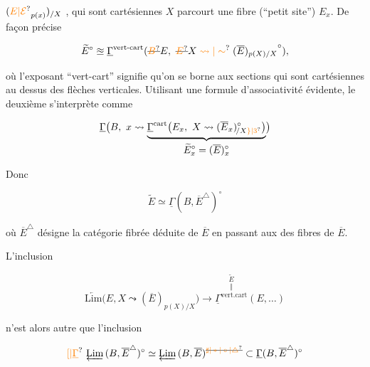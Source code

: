 $(\unsure{E|\mathcal E}_{p(x)})_{/X}$ ,
 qui sont
cartésiennes  $X$ parcourt une fibre
(``petit site'') $E_x$. De façon précise

\[
\widetilde E^\circ \approxeq \underline{\Gamma}^{\mathrm{vert\text{-}cart}}
(\deleted{\unsure{B}}E,\ \deleted{\unsure{E}}X\mathrel{\unsure{\leadsto|\sim}}
{(\overline E)_{p(X)/X}}^\circ),
\]

où l'exposant ``vert-cart'' signifie qu'on
se borne aux sections qui sont cartésiennes
au dessus des flèches verticales. Utilisant
une formule d'associativité évidente, le
deuxième  s'interprète comme

\[
\underline{\Gamma}\bigl(B,\ x\leadsto
\underbrace{\underline{\Gamma}^{\mathrm{cart}}\bigl(E_x,\ X\leadsto
(\overline E_x)^\circ_{\!/X\unsure{\rbrace|3}}\bigr)}_{\displaystyle\widetilde E_x^\circ=(\overline E)_x^\circ}
\bigr)
\]

Donc

\[
\widetilde E\simeq\underline{\Gamma}(B,\overline E^\triangle)^\circ
\]

où $\overline E^\triangle$ désigne la catégorie fibrée déduite de
$\overline E$ en passant aux   des fibres de $\overline E$.

L'inclusion

\[
\underleftarrow{\mathrm{Lim}}\bigl(E,X\leadsto(\overline E)_{p(X)/X}\bigr)
\longrightarrow\overset{\widetilde E}{\overset{\Vert}{\underline{\Gamma}^{\mathrm{vert.cart}}}}
(E,\ldots)
\]

n'est alors autre  que l'inclusion

\[
\unsure{[|\underline{\Gamma}}\ \underleftarrow{\mathrm{Lim}}\,(B,\overline E^\triangle)^\circ
\simeq\underleftarrow{\mathrm{Lim}}\,(B,\overline E)^{\deleted{\unsure{\sharp|*|\circ|\triangle}}}
\subset\underline{\Gamma}(B,\overline E^\triangle)^\circ
\]





